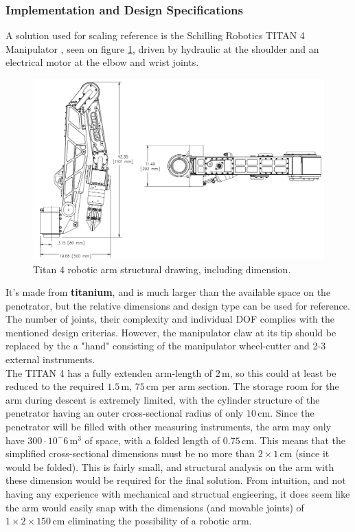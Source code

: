 
\subsubsection{Implementation and Design Specifications}
A solution used for scaling reference is the Schilling Robotics TITAN 4 Manipulator \cite{Titan4}, seen on figure \ref{fig:titan4}, driven by hydraulic at the shoulder and an electrical motor at the elbow and wrist joints.
\begin{figure}[htb]
	\centering
	\includegraphics[width=1\textwidth]{figures/Rasmus/Titan4}
	\caption{Titan 4 robotic arm structural drawing, including dimension.
	\label{fig:titan4}}
\end{figure}
 It's made from \textbf{titanium}, and is much larger than the available space on the penetrator, but the relative dimensions and design type can be used for reference. The number of joints, their complexity and individual DOF complies with the mentioned design criterias. However, the manipulator claw at its tip should be replaced by the a "hand" consisting of the manipulator wheel-cutter and 2-3 external instruments.\\
The TITAN 4 has a fully extenden arm-length of $2\,\mathrm{m}$, so this could at least be reduced to the required $\mathbf{1.5\,\mathrm{m}}$, $75\,\mathrm{cm}$ per arm section. The storage room for the arm during descent is extremely limited, with the cylinder structure of the penetrator having an outer cross-sectional radius of only $10\,\mathrm{cm}$. Since the penetrator will be filled with other measuring instruments, the arm may only have $300\cdot10^-6 \,\mathrm{m^3}$ of space, with a folded length of $0.75\,\mathrm{cm}$. This means that the simplified  cross-sectional dimensions must be no more than $2\times 1\,\mathrm{cm}$ (since it would be folded). This is fairly small, and structural analysis on the arm with these dimension would be required for the final solution. From intuition, and not having any experience with mechanical and structual engieering, it does seem like the arm would easily snap with the dimensions (and movable joints) of $1\times 2\times 150\,\mathrm{cm}$ eliminating the possibility of a robotic arm.\\ 
